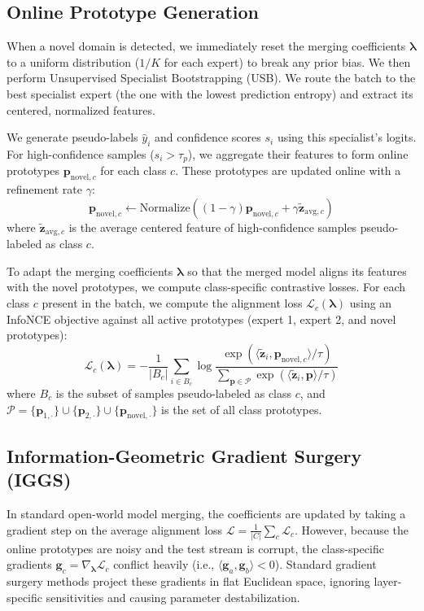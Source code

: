 \documentclass{article}
\theoremstyle{plain}
\theoremstyle{definition}
\theoremstyle{remark}
\begin{document}
\subsection{Online Prototype Generation}
When a novel domain is detected, we immediately reset the merging coefficients $\boldsymbol{\lambda}$ to a uniform distribution ($1/K$ for each expert) to break any prior bias. We then perform Unsupervised Specialist Bootstrapping (USB). We route the batch to the best specialist expert (the one with the lowest prediction entropy) and extract its centered, normalized features. 

We generate pseudo-labels $\hat{y}_i$ and confidence scores $s_i$ using this specialist's logits. For high-confidence samples ($s_i > \tau_p$), we aggregate their features to form online prototypes $\mathbf{p}_{\text{novel}, c}$ for each class $c$. These prototypes are updated online with a refinement rate $\gamma$:
\begin{equation}
    \mathbf{p}_{\text{novel}, c} \leftarrow \text{Normalize}\left( (1-\gamma) \mathbf{p}_{\text{novel}, c} + \gamma \tilde{\mathbf{z}}_{\text{avg}, c} \right)
\end{equation}
where $\tilde{\mathbf{z}}_{\text{avg}, c}$ is the average centered feature of high-confidence samples pseudo-labeled as class $c$.

To adapt the merging coefficients $\boldsymbol{\lambda}$ so that the merged model aligns its features with the novel prototypes, we compute class-specific contrastive losses. For each class $c$ present in the batch, we compute the alignment loss $\mathcal{L}_c(\boldsymbol{\lambda})$ using an InfoNCE objective against all active prototypes (expert 1, expert 2, and novel prototypes):
\begin{equation}
    \mathcal{L}_c(\boldsymbol{\lambda}) = -\frac{1}{|B_c|} \sum_{i \in B_c} \log \frac{\exp(\langle \tilde{\mathbf{z}}_i, \mathbf{p}_{\text{novel}, c} \rangle / \tau)}{\sum_{\mathbf{p} \in \mathcal{P}} \exp(\langle \tilde{\mathbf{z}}_i, \mathbf{p} \rangle / \tau)}
\end{equation}
where $B_c$ is the subset of samples pseudo-labeled as class $c$, and $\mathcal{P} = \{\mathbf{p}_{1, \cdot}\} \cup \{\mathbf{p}_{2, \cdot}\} \cup \{\mathbf{p}_{\text{novel}, \cdot}\}$ is the set of all class prototypes.

\subsection{Information-Geometric Gradient Surgery (IGGS)}
In standard open-world model merging, the coefficients are updated by taking a gradient step on the average alignment loss $\mathcal{L} = \frac{1}{|C|} \sum_{c} \mathcal{L}_c$. However, because the online prototypes are noisy and the test stream is corrupt, the class-specific gradients $\mathbf{g}_c = \nabla_{\boldsymbol{\lambda}} \mathcal{L}_c$ conflict heavily (i.e., $\langle \mathbf{g}_a, \mathbf{g}_b \rangle < 0$). Standard gradient surgery methods project these gradients in flat Euclidean space, ignoring layer-specific sensitivities and causing parameter destabilization.
\end{document}

